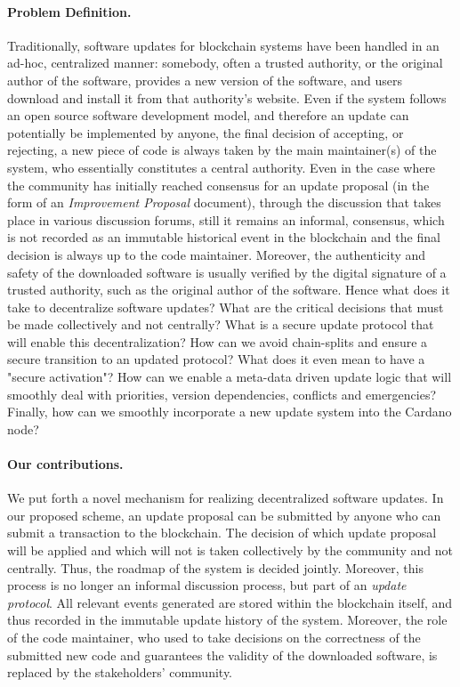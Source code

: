 \paragraph{Problem Definition.}
Traditionally, software updates for blockchain systems have been handled in an
ad-hoc, centralized manner: somebody, often a trusted authority, or the original
author of the software, provides a new version of the software, and users
download and install it from that authority's website. Even if the system
follows an open source software development model, and therefore an update can
potentially be implemented by anyone, the final decision of accepting, or
rejecting, a new piece of code is always taken by the main maintainer(s) of the
system, who essentially constitutes a central authority. Even in the case where
the community has initially reached consensus for an update proposal (in the
form of an \emph{Improvement Proposal} document), through the discussion that
takes place in various discussion forums, still it remains an informal,
 consensus, which is not recorded as an immutable historical event
in the blockchain and the final decision is always up to the code maintainer.
Moreover, the authenticity and safety of the downloaded software is usually
verified by the digital signature of a trusted authority, such as the original
author of the software. Hence what does it take to decentralize software
updates? What are the critical decisions that must be made collectively and not
centrally? What is a secure update protocol that will enable this
decentralization? How can we avoid chain-splits and ensure a secure transition
to an updated protocol? What does it even mean to have a "secure activation"?
How can we enable a meta-data driven update logic that will smoothly deal with
priorities, version dependencies, conflicts and emergencies? Finally, how can
we smoothly incorporate a new update system into the Cardano node?

\paragraph{Our contributions.}
We put forth a novel mechanism for realizing decentralized software updates. In
our proposed scheme, an update proposal can be submitted by anyone
who can submit a transaction to the blockchain. The decision of which update
proposal will be applied and which will not is taken collectively by the
community and not centrally. Thus, the roadmap of the system is decided
jointly. Moreover, this process is no longer an informal discussion process,
but part of an \emph{update protocol}. All relevant events generated are stored
within the blockchain itself, and thus recorded in the immutable update history
of the system. Moreover, the role of the code maintainer, who used to take
decisions on the correctness of the submitted new code and guarantees the
validity of the downloaded software, is replaced by the stakeholders' community.

